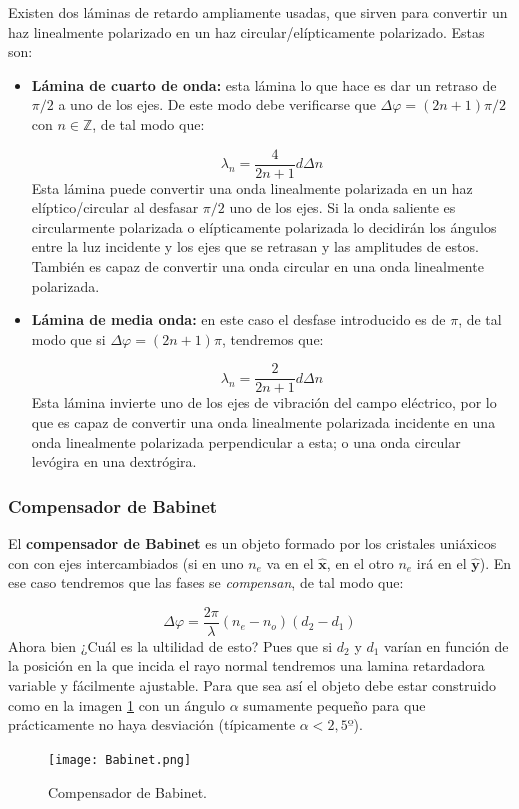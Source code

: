 \documentclass[12pt]{article}
\newcommand{\hnx}{\hat{\mathbf{x}}}
\newcommand{\hny}{\hat{\mathbf{y}}}
\numberwithin{equation}{section}
\numberwithin{figure}{section}
\begin{document}
Existen dos láminas de retardo ampliamente usadas, que sirven para convertir un haz linealmente polarizado en un haz circular/elípticamente polarizado. Estas son:

\begin{itemize}
\item  \textbf{Lámina de cuarto de onda:} esta lámina lo que hace es dar un retraso de $\pi/2$ a uno de los ejes. De este modo debe verificarse que $\Delta \varphi = (2n+1) \pi / 2$ con $n\in \mathbb{Z}$, de tal modo que:

\begin{equation}
\lambda_n = \dfrac{4}{2n+1} d \Delta n 
\end{equation}
Esta lámina puede convertir una onda linealmente polarizada en un haz elíptico/circular al desfasar $\pi/2$ uno de los ejes. Si la onda saliente es circularmente polarizada o elípticamente polarizada lo decidirán los ángulos entre la luz incidente y los ejes que se retrasan y las amplitudes de estos. También es capaz de convertir una onda circular en una onda linealmente polarizada.

\item \textbf{Lámina de media onda:} en este caso el desfase introducido es de $\pi$, de tal modo que si $\Delta \varphi  = (2n+1) \pi$, tendremos que:


\begin{equation}
\lambda_n = \dfrac{2}{2n+1} d \Delta n 
\end{equation}
Esta lámina invierte uno de los ejes de vibración del campo eléctrico, por lo que es capaz de convertir una onda linealmente polarizada incidente en una onda linealmente polarizada perpendicular a esta; o una onda circular levógira en una dextrógira. 
\end{itemize}

\subsubsection{Compensador de Babinet}

El \textbf{compensador de Babinet} es un objeto formado por los cristales uniáxicos con con ejes intercambiados (si en uno $n_e$ va en el $\hnx$, en el otro $n_e$ irá en el $\hny$). En ese caso tendremos que las fases se \textit{compensan}, de tal modo que:


\begin{equation}
\Delta \varphi = \dfrac{2 \pi}{\lambda} (n_e - n_o ) (d_2-d_1)
\end{equation}
Ahora bien ¿Cuál es la ultilidad de esto? Pues que si $d_2$ y $d_1$ varían en función de la posición en la que incida el rayo normal tendremos una lamina retardadora variable y fácilmente ajustable. Para que sea así el objeto debe estar construido como en la imagen \ref{Fig:10.3.1.01} con un ángulo $\alpha$ sumamente pequeño para que prácticamente no haya desviación (típicamente $\alpha < 2,5º$). 

\begin{figure}[h!] \centering
\texttt{[image: Babinet.png]}
\caption{Compensador de Babinet.}
\label{Fig:10.3.1.01}
\end{figure}
\end{document}
